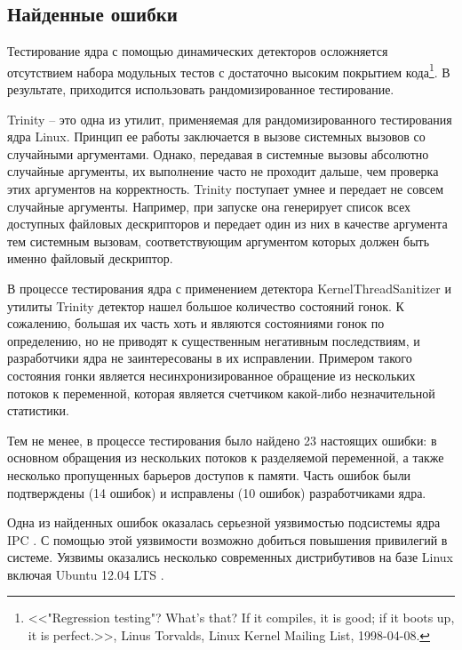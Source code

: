 
\subsection{Найденные ошибки}

Тестирование ядра с помощью динамических детекторов осложняется отсутствием набора модульных тестов с достаточно высоким покрытием кода\footnote{<<"Regression testing"? What's that? If it compiles, it is good; if it boots up, it is perfect.>>, Linus Torvalds, Linux Kernel Mailing List, 1998-04-08.}.
В результате, приходится использовать рандомизированное тестирование.

Trinity \cite{trinity} -- это одна из утилит, применяемая для рандомизированного тестирования ядра Linux.
Принцип ее работы заключается в вызове системных вызовов со случайными аргументами.
Однако, передавая в системные вызовы абсолютно случайные аргументы, их выполнение часто не проходит дальше, чем проверка этих аргументов на корректность.
Trinity поступает умнее и передает не совсем случайные аргументы.
Например, при запуске она генерирует список всех доступных файловых дескрипторов и передает один из них в качестве аргумента тем системным вызовам, соответствующим аргументом которых должен быть именно файловый дескриптор.

В процессе тестирования ядра с применением детектора KernelThreadSanitizer и утилиты Trinity детектор нашел большое количество состояний гонок.
К сожалению, большая их часть хоть и являются состояниями гонок по определению, но не приводят к существенным негативным последствиям, и разработчики ядра не заинтересованы в их исправлении.
Примером такого состояния гонки является несинхронизированное обращение из нескольких потоков к переменной, которая является счетчиком какой-либо незначительной статистики.

Тем не менее, в процессе тестирования было найдено 23 настоящих ошибки: в основном обращения из нескольких потоков к разделяемой переменной, а также несколько пропущенных барьеров доступов к памяти.
Часть ошибок были подтверждены (14 ошибок) и исправлены (10 ошибок) разработчиками ядра.

Одна из найденных ошибок оказалась серьезной уязвимостью подсистемы ядра IPC \cite{cve-mitre}.
С помощью этой уязвимости возможно добиться повышения привилегий в системе.
Уязвимы оказались несколько современных дистрибутивов на базе Linux включая Ubuntu 12.04 LTS \cite{cve-affected}.

